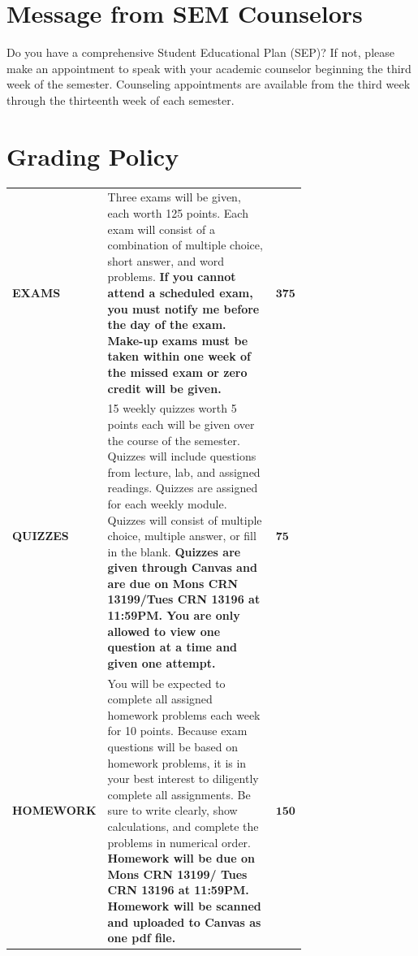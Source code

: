 \documentclass[11pt]{article}
\begin{document}
\section{Message from SEM Counselors}

Do you have a comprehensive Student Educational Plan (SEP)? If not, please make
an appointment to speak with your academic counselor beginning the third week of
the semester. Counseling appointments are available from the third week through
the thirteenth week of each semester. 

\section{Grading Policy}

\begin{table}[H]
\label{tab:grade_policy}
\begin{tabular}{|l|p{0.72\linewidth}|l|}
  \hline
  \textbf{EXAMS} & Three exams will be given, each worth 125 points. Each exam
  will consist of a combination of multiple choice, short answer, and word problems.
  \textbf{If you cannot attend a scheduled exam, you must notify me before the day of the exam.
  Make-up exams must be taken within one week of the missed exam or zero credit will be
  given.}
  & $\mathbf{375}$ \\

  \textbf{QUIZZES} & 15 weekly quizzes worth 5 points each will be given over the course of
  the semester. Quizzes will include questions from lecture, lab, and assigned readings.
  Quizzes are assigned for each weekly module. Quizzes will consist of multiple choice,
  multiple answer, or fill in the blank. \textbf{Quizzes are given through Canvas and are due on
  Mons CRN 13199/Tues CRN 13196 at 11:59PM. You are only allowed to view one question at a
  time and given one attempt.}
  & $\mathbf{75}$ \\
  
  \textbf{HOMEWORK} & You will be expected to complete all assigned homework problems each week for
  10 points. Because exam questions will be based on homework problems, it is in your best
  interest to diligently complete all assignments. Be sure to write clearly, show calculations,
  and complete the problems in numerical order. \textbf{Homework will be due on Mons CRN 13199/
  Tues CRN 13196 at 11:59PM. Homework will be scanned and uploaded to Canvas as one pdf file.}
  & $\mathbf{150}$ \\


\end{tabular}
\end{table}
\end{document}
